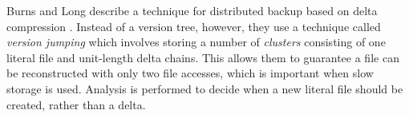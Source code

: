 \documentclass{llncs}
\begin{document}
Burns and Long describe a technique for distributed backup based on
delta compression \cite{Burns:Backup}.  Instead of a version tree,
however, they use a technique called \emph{version jumping} which
involves storing a number of \emph{clusters} consisting of one
literal file and unit-length delta chains.  This allows them to
guarantee a file can be reconstructed with only two file accesses,
which is important when slow storage is used.  Analysis is performed
to decide when a new literal file should be created, rather than a
delta.






\end{document}
